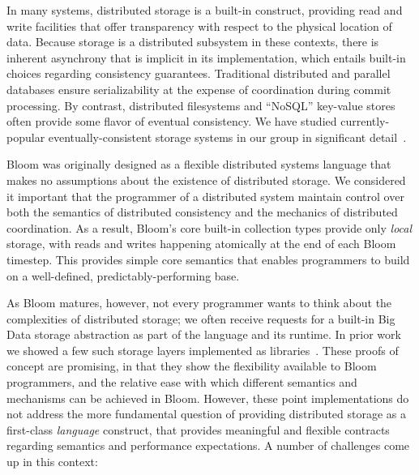 In many systems, distributed storage is a built-in construct, providing read and write facilities that offer transparency with respect to the physical location of data.  Because storage is a distributed subsystem in these contexts, there is inherent asynchrony that is implicit in its implementation, which  entails built-in choices regarding consistency guarantees. Traditional distributed and parallel databases ensure serializability at the expense of coordination during commit processing.  By contrast, distributed filesystems and ``NoSQL'' key-value stores often provide some flavor of eventual consistency.  We have studied currently-popular eventually-consistent storage systems in our group in significant detail~\cite{boom-eurosys,bailis}.

Bloom was originally designed as a flexible distributed systems language that makes no assumptions about the existence of distributed storage.  We considered it important that the  programmer of a distributed system maintain control over both the semantics of distributed consistency and the mechanics of distributed coordination.  As a result, Bloom's core built-in collection types provide only \emph{local} storage, with reads and writes happening atomically at the end of each Bloom timestep.  This provides simple core semantics that enables programmers to build on a well-defined, predictably-performing base.

As Bloom matures, however, not every programmer wants to think about the complexities of distributed storage; we often receive requests for a built-in Big Data storage abstraction as part of the language and its runtime.  In prior work we showed a few such storage layers implemented as libraries~\cite{boom-eurosys,sandbox}.  These proofs of concept are promising, in that they show the flexibility available to Bloom programmers, and the relative ease with which different semantics and mechanisms can be achieved in Bloom.  However, these point implementations do not address the more fundamental question of providing distributed storage as a first-class \emph{language} construct, that provides meaningful and flexible contracts regarding semantics and performance expectations.   A number of challenges come up in this context:

